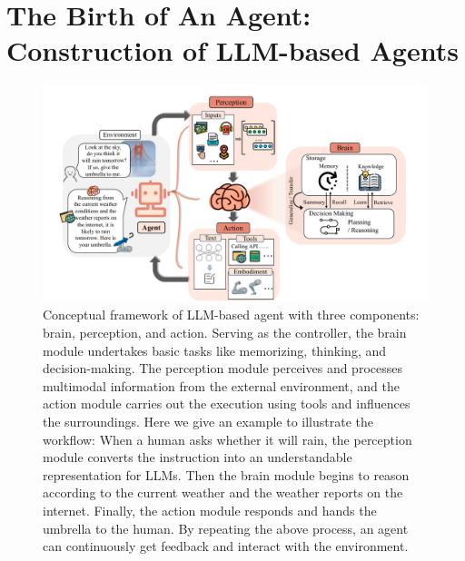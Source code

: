 \section{The Birth of An Agent: Construction of LLM-based Agents}\label{sec:The Birth of An Agent: Construction of LLM-based Agents}


\begin{figure}[htbp]
    \centering
    \includegraphics[width=1\textwidth]
    {figures/sec3_construction_v2.pdf}
    \caption{Conceptual framework of LLM-based agent with three components: brain, perception, and action. Serving as the controller, the brain module undertakes basic tasks like memorizing, thinking, and decision-making. The perception module perceives and processes multimodal information from the external environment, and the action module carries out the execution using tools and influences the surroundings. Here we give an example to illustrate the workflow: When a human asks whether it will rain, the perception module converts the instruction into an understandable representation for LLMs. Then the brain module begins to reason according to the current weather and the weather reports on the internet. Finally, the action module responds and hands the umbrella to the human. By repeating the above process, an agent can continuously get feedback and interact with the environment.}
    \label{fig: agent_construction}
\end{figure} 


